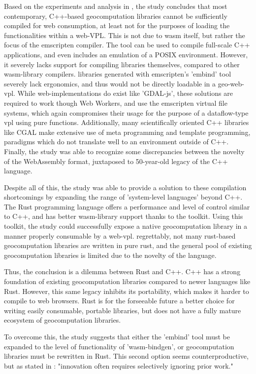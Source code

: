 Based on the experiments and analysis in , the study concludes that most contemporary, C++-based geocomputation libraries cannot be sufficiently compiled for web consumption, at least not for the purposes of loading the functionalities within a web-VPL.    
This is not due to wasm itself, but rather the focus of the emscripten compiler.
The tool can be used to compile full-scale C++ applications, and even includes an emulation of a POSIX environment.
However, it severely lacks support for compiling libraries themselves, compared to other wasm-library compilers.
libraries generated with emscripten's 'embind' tool severely lack ergonomics, and thus would not be directly loadable in a geo-web-vpl.
While web-implementations do exist like 'GDAL-js', these solutions are required to work though Web Workers, and use the emscripten virtual file systems, which again compromises their usage for the purpose of a dataflow-type vpl using pure functions.
Additionally, many scientifically oriented C++ libraries like CGAL make extensive use of meta programming and template programming, paradigms which do not translate well to an environment outside of C++. 
Finally, the study was able to recognize some discrepancies between the novelty of the WebAssembly format, juxtaposed to 50-year-old legacy of the C++ language.

Despite all of this, the study was able to provide a solution to these compilation shortcomings by expanding the range of 'system-level languages' beyond C++. 
The Rust programming language offers a performance and level of control similar to C++, and has better wasm-library support thanks to the  toolkit. 
Using this toolkit, the study could successfully expose a native geocomputation library in a manner properly consumable by a web-vpl.
regrettably, not many rust-based geocomputation libraries are written in pure rust, and the general pool of existing geocomputation libraries is limited due to the novelty of the language. 

Thus, the conclusion is a dilemma between Rust and C++.
C++ has a strong foundation of existing geocomputation libraries compared to newer languages like Rust.  
However, this same legacy inhibits its portability, which makes it harder to compile to web browsers. 
Rust is for the forseeable future a better choice for writing easily consumable, portable libraries, but does not have a fully mature ecosystem of geocomputation libraries. 

To overcome this, the study suggests that either the 'embind' tool must be expanded to the level of functionality of 'wasm-bindgen', or geocomputation libraries must be rewritten in Rust. 
This second option seems counterproductive, but as stated in \citep{ammann_maplibre-rs_2022}: "innovation often requires selectively ignoring prior work."

